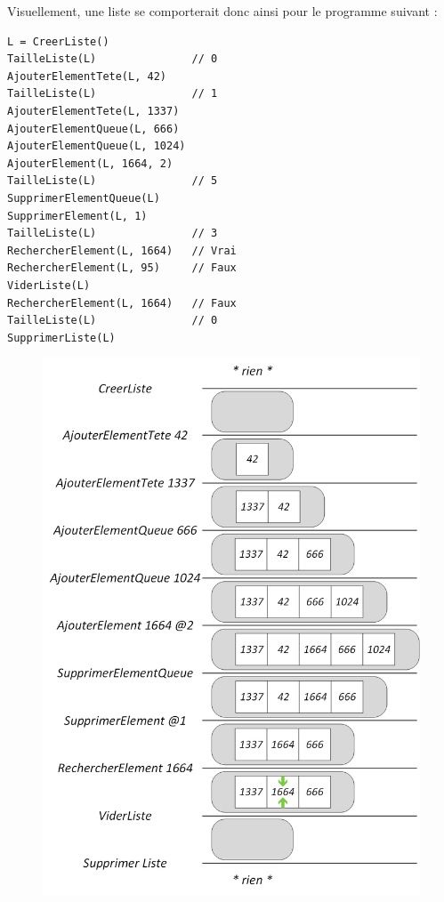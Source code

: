 \documentclass[11pt,a4paper]{article}
\begin{document}
\pagebreak

Visuellement, une liste se comporterait donc ainsi pour le programme suivant :

\begin{center}
\begin{lstlisting}[style=algorithmique]
L = CreerListe()
TailleListe(L)               // 0
AjouterElementTete(L, 42)
TailleListe(L)               // 1
AjouterElementTete(L, 1337)
AjouterElementQueue(L, 666)
AjouterElementQueue(L, 1024)
AjouterElement(L, 1664, 2)
TailleListe(L)               // 5
SupprimerElementQueue(L)
SupprimerElement(L, 1)
TailleListe(L)               // 3
RechercherElement(L, 1664)   // Vrai
RechercherElement(L, 95)     // Faux
ViderListe(L)
RechercherElement(L, 1664)   // Faux
TailleListe(L)               // 0
SupprimerListe(L) \end{lstlisting}


\begin{figure}[ht!]
\centering
\centerline{  %
\includegraphics[scale=0.7]{img/listes/Listes_exemple1bis.png}
}
\end{figure}

\end{center}
\end{document}
